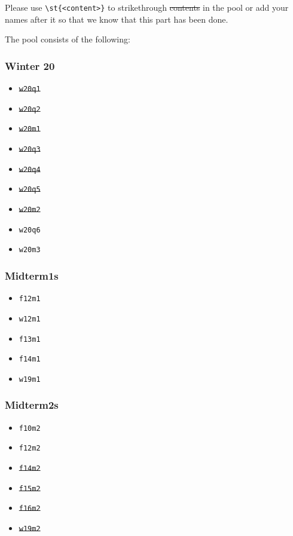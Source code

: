 Please use \lstinline|\st{<content>}| to strikethrough \st{contents} in the pool or add your names after it so that we know that this part has been done.

The pool consists of the following:

\def\width{0.24}
\begin{minipage}[t]{\width\textwidth}
    \subsubsection*{Winter 20}
    \begin{itemize}
        \item \st{\texttt{w20q1}}
        \item \st{\texttt{w20q2}}
        \item \st{\texttt{w20m1}}
        \item \st{\texttt{w20q3}}
        \item \st{\texttt{w20q4}}
        \item \st{\texttt{w20q5}}
        \item \st{\texttt{w20m2}}
        \item \texttt{w20q6}
        \item \texttt{w20m3}
    \end{itemize}
\end{minipage}
\begin{minipage}[t]{\width\textwidth}
    \subsubsection*{Midterm1s}
    \begin{itemize}
        \item \texttt{f12m1}
        \item \texttt{w12m1}
        \item \texttt{f13m1}
        \item \texttt{f14m1}
        \item \texttt{w19m1}
    \end{itemize}    
\end{minipage}
\begin{minipage}[t]{\width\textwidth}
    \subsubsection*{Midterm2s}
    \begin{itemize}
        \item \texttt{f10m2}
        \item \texttt{f12m2}
        \item \st{\texttt{f14m2}}
        \item \st{\texttt{f15m2}}
        \item \st{\texttt{f16m2}}
        \item \st{\texttt{w19m2}}
    \end{itemize}    
\end{minipage}

